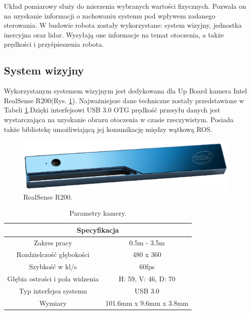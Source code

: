 Układ pomiarowy służy do mierzenia wybranych wartości fizycznych. Pozwala on na uzyskanie informacji o zachowaniu systemu pod wpływem zadanego sterowania. W budowie robota zostały wykorzystane: system wizyjny, jednostka inercyjna oraz lidar. Wysyłają one informacje na temat otoczenia, a także prędkości i przyśpieszenia robota.
\subsection{System wizyjny}

Wykorzystanym systemem wizyjnym jest dedykowana dla Up Board kamera Intel RealSense R200(Rys. \ref{fig:realsense}).  Najważniejsze dane techniczne zostały przedstawione w Tabeli \ref{kamera}.Dzięki interfejsowi USB 3.0 OTG prędkość przesyłu danych jest wystarczająca na uzyskanie obrazu otoczenia w czasie rzeczywistym. Posiada także bibliotekę umożliwiającą jej komunikację między wątkową ROS.

\begin{figure}[ht]
	\centering
	\includegraphics[scale=0.6]{realsense.png}
	\caption{RealSense R200.}
	\label{fig:realsense}
\end{figure}

\begin{table}[]
	\centering
	\caption{Parametry kamery.}
	\label{kamera}
	\begin{tabular}{|c|c|}
		\hline
		\multicolumn{2}{|c|}{\textbf{Specyfikacja}}               \\ \hline
		Zakres pracy                    & 0.5m - 3.5m             \\ \hline
		Rozdzielczość głębokości        & 480 x 360               \\ \hline
		Szybkość w kl/s                 & 60fps                   \\ \hline
		Głębia ostrości i pola widzenia & H: 59, V: 46, D: 70     \\ \hline
		Typ interfejsu systemu          & USB 3.0                 \\ \hline
		Wymiary                         & 101.6mm x 9.6mm x 3.8mm \\ \hline
	\end{tabular}
\end{table}


